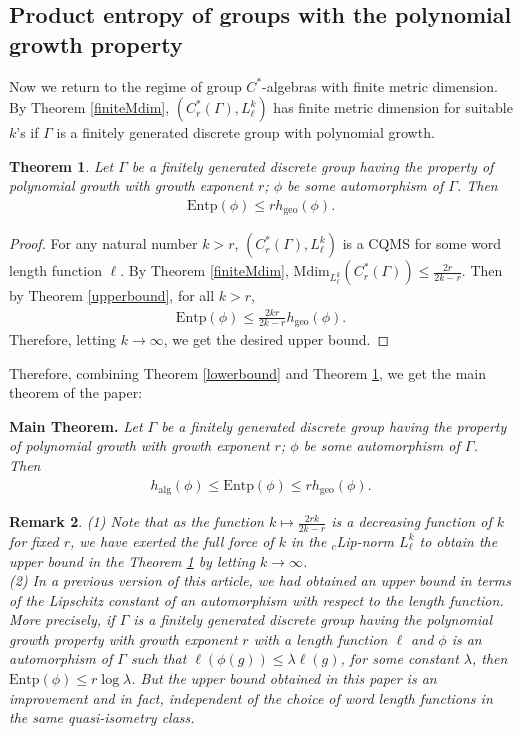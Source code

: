 \documentclass[a4paper,11pt,reqno]{amsart}
\theoremstyle{plain}
\newtheorem{thm}{Theorem}[section]
\newtheorem{rem}[thm]{Remark}
\theoremstyle{mainthmstyle}
\theoremstyle{named}
\newenvironment{maintheorem}
{\par\noindent\textbf{Main Theorem.}\itshape}
{\par}
\numberwithin{equation}{section}
\begin{document}
\subsection{Product entropy of groups with the polynomial growth property}
Now we return to the regime of group $C^{\ast}$-algebras with finite metric dimension. By Theorem \ref{finiteMdim}, $(C^{\ast}_{r}(\Gamma),L^{k}_{\ell})$ has finite metric dimension for suitable $k$'s if $\Gamma$ is a finitely generated discrete group with polynomial growth. 
 \begin{thm}\label{boundpolygrowth}
   Let $\Gamma$ be a finitely generated discrete group having the property of polynomial growth with growth exponent $r$; $\phi$ be some automorphism of $\Gamma$. Then 
   \begin{align*}
       \mathrm{Entp}(\phi)\leq rh_{\mathrm{geo}}(\phi).
   \end{align*}
 \end{thm} 
\begin{proof}
    For any natural number $k>r$, $(C^{\ast}_{r}(\Gamma),L^{k}_{\ell})$ is a CQMS for some word length function $\ell$. By Theorem \ref{finiteMdim}, $\mathrm{Mdim}_{L^{k}_{\ell}}(C^{\ast}_{r}(\Gamma))\leq \frac{2r}{2k-r}$. Then by Theorem \ref{upperbound}, for all $k>r$,
    \begin{align*}
        \mathrm{Entp}(\phi)\leq \frac{2kr}{2k-r}h_{\mathrm{geo}}(\phi).
    \end{align*}
    Therefore, letting $k\rightarrow\infty$, we get the desired upper bound.
\end{proof}
Therefore, combining Theorem \ref{lowerbound} and Theorem \ref{boundpolygrowth}, we get the main theorem of the paper$:$
\begin{maintheorem}\label{mainthm}
 Let $\Gamma$ be a finitely generated discrete group having the property of polynomial growth with growth exponent $r$; $\phi$ be some automorphism of $\Gamma$. Then 
   \begin{align*}
       h_{\mathrm {alg}} (\phi) \leq \mathrm{Entp}(\phi)\leq rh_{\mathrm{geo}}(\phi).
   \end{align*}
\end{maintheorem}
\begin{rem}\label{Lips}
    (1) Note that as the function $k\mapsto\frac{2rk}{2k-r}$ is a decreasing function of $k$ for fixed $r$, we have exerted the full force of $k$ in the ${}_c$Lip-norm $L^{k}_{\ell}$ to obtain the upper bound in the Theorem \ref{boundpolygrowth} by letting $k\rightarrow\infty$.\\
    (2) In a previous version of this article, we had obtained an upper bound in terms of the Lipschitz constant of an automorphism with respect to the length function. More precisely, if $\Gamma$ is a finitely generated discrete group having the polynomial growth property with growth exponent $r$ with a length function $\ell$ and $\phi$ is an automorphism of $\Gamma$ such that $\ell(\phi(g))\leq \lambda \ell(g)$, for some constant $\lambda$, then $\mathrm{Entp}(\phi)\leq r\log\lambda$. But the upper bound obtained in this paper is an improvement and in fact, independent of the choice of word length functions in the same quasi-isometry class. 
 \end{rem}
\end{document}
